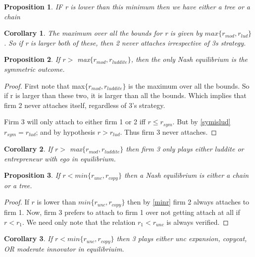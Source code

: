 \documentclass{article}
\newtheorem{corollary}{Corollary}
\newtheorem{proposition}{Proposition}
\begin{document}
\begin{proposition}
IF r is lower than this minimum then we have either a tree or a chain
\end{proposition}

\begin{corollary} \label{maxr}
The maximum over all the bounds for r is given by $max \{ r_{mod},r_{lud}  \}$. So if r is larger both of these, then 2 never attaches irrespective of 3s strategy.
\end{corollary}

\begin{proposition} \label{Symmetric}
If $r>$ max$\{ r_{mod},r_{luddite} \}$, then the only Nash equilibrium is the symmetric outcome. 
\end{proposition}

\begin{proof}
First note that max$\{ r_{mod},r_{luddite} \}$ is the maximum over all the bounds. So if r is larger than these two, it is larger than all the bounds. Which implies that firm 2 never attaches itself, regardless of 3's strategy. 

Firm 3 will only attach to either firm 1 or 2 iff $r \leq r_{sym}$. But by \ref{symislud} $r_{sym}=r_{lud}$; and by hypothesis $r > r_{lud}$. Thus firm 3 never attaches. 
\end{proof}

\begin{corollary}
If $r>$ max$\{ r_{mod},r_{luddite} \}$ then firm 3 only plays either luddite or entrepreneur with ego in equilibrium. 
\end{corollary}

\begin{proposition}
If  $r< min\{ r_{unc}, r_{copy} \}$ then a Nash equilibrium is either a chain or a tree.
\end{proposition}

\begin{proof}
If $r$ is lower than $ min\{ r_{unc}, r_{copy} \}$ then by \ref{minr} firm 2 always attaches to firm 1. Now, firm 3 prefers to attach to firm 1 over not getting attach at all if $r<r_1$. We need only note that the relation $r_1<r_{unc}$ is always verified.  
\end{proof}


\begin{corollary}
If $r< min\{ r_{unc}, r_{copy} \}$ then 3 plays either unc expansion, copycat, OR moderate innovator in equilibriuim.
\end{corollary}
\end{document}
